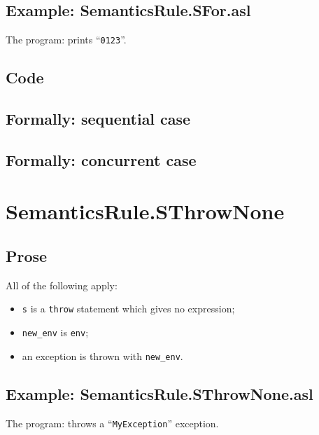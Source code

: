 \documentclass{book}
\begin{document}
    \subsection{Example: SemanticsRule.SFor.asl}
    The program:
    prints ``\texttt{0123}''.

  \subsection{Code}

\begin{emptyformal}
  \subsection{Formally: sequential case}

  \subsection{Formally: concurrent case}
\end{emptyformal}


\section{SemanticsRule.SThrowNone \label{sec:SemanticsRule.SThrowNone}}

    \subsection{Prose}
    All of the following apply:
    \begin{itemize}
    \item \texttt{s} is a \texttt{throw} statement which gives no expression;
    \item \texttt{new\_env} is \texttt{env};
    \item an exception is thrown with \texttt{new\_env}.
    \end{itemize}

    \subsection{Example: SemanticsRule.SThrowNone.asl}
    The program:
    throws a ``\texttt{MyException}'' exception.
\end{document}
